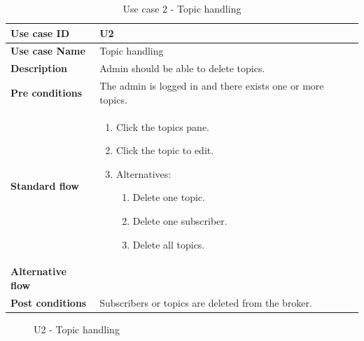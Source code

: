 \begin{table}[ht!]
\centering
\begin{tabular}{|l|p{5cm}|}
\hline
\textbf{Use case ID} & U2 \\ \hline
\textbf{Use case Name} & Topic handling \\ \hline
\textbf{Description} & Admin should be able to delete topics.  \\ \hline
\textbf{Pre conditions} & The admin is logged in and there exists one or more topics. \\ \hline
\textbf{Standard flow} & \begin{enumerate}
\item Click the topics pane.
\item Click the topic to edit.
\item Alternatives: \begin{enumerate}
    \item Delete one topic.
    \item Delete one subscriber.
    \item Delete all topics.
\end{enumerate}
\end{enumerate} \\ \hline
\textbf{Alternative flow} &  \\ \hline
\textbf{Post conditions} & Subscribers or topics are deleted from the broker.  \\ \hline
\end{tabular}
\caption{Use case 2 - Topic handling}
\label{uc2}
\end{table}

\begin{center}
  \begin{figure}[ht!]
    \caption{U2 - Topic handling}
    \label{fig:u2}
  \end{figure}
\end{center}

\clearpage

